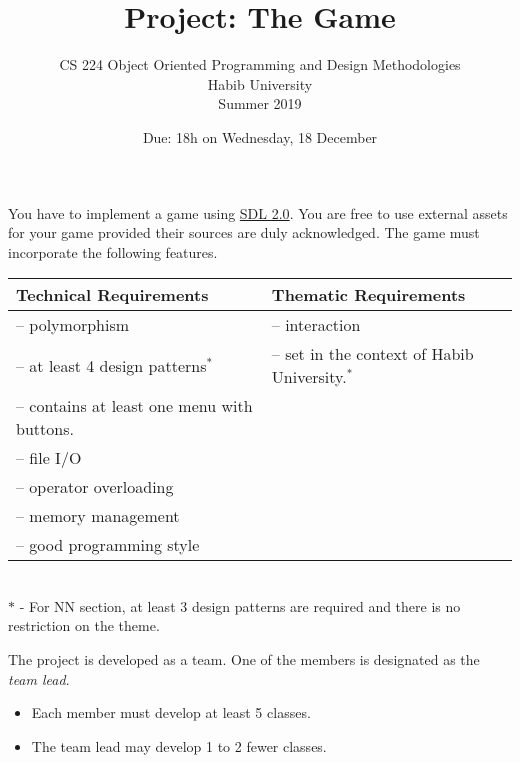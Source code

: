 \documentclass[addpoints]{exam}
\title{Project: The Game}
\author{CS 224 Object Oriented Programming and Design Methodologies\\Habib University\\Summer 2019}
\date{Due: 18h on Wednesday, 18 December}
\begin{document}
\maketitle
\thispagestyle{empty}

\begin{questions}

You have to implement a game using \href{https://www.libsdl.org}{SDL 2.0}. You are free to use external assets for your game provided their sources are duly acknowledged. The game must incorporate the following features.

\begin{tabular}{|l|l|}
  \hline
  Technical Requirements & Thematic Requirements\\
  \hline\hline
  --  polymorphism & -- interaction \\
  --  at least 4 design patterns$^*$ & -- set in the context of Habib University.$^*$ \\
  --  contains at least one menu with buttons. &\\
  --  file I/O &\\
  --  operator overloading & \\
  --  memory management & \\
  --  good programming style &\\
  \hline
\end{tabular}\\
$*$ - For NN section, at least 3 design patterns are required and there is no restriction on the theme.

The project is developed as a team. One of the members is designated as the \emph{team lead}. 
\begin{itemize}
\item Each member must develop at least 5 classes.
\item The team lead may develop 1 to 2 fewer classes.
\end{itemize}


\end{questions}
\end{document}

